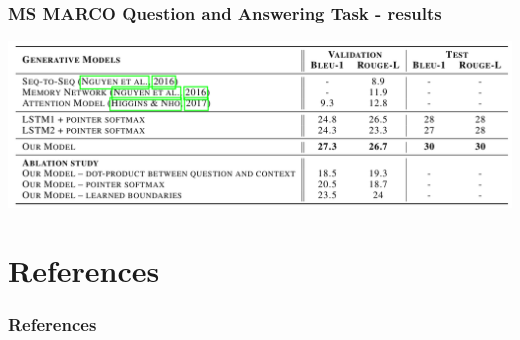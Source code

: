 \documentclass{beamer}
\begin{document}
\begin{frame}
    \frametitle{MS MARCO Question and Answering Task - results}
    \begin{center}
        \includegraphics[scale=0.9]{img/msmarco-table.png}
    \end{center}
\end{frame}


\section{References}
\begin{frame}[allowframebreaks,t]
    \tiny
    \frametitle{References}
    
    
\end{frame}
\end{document}
